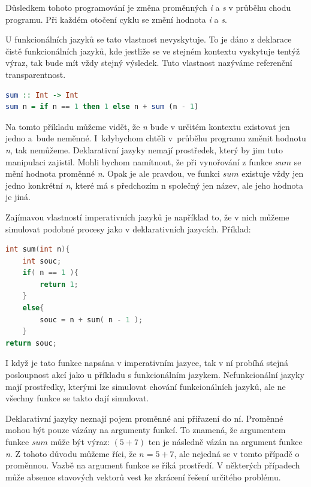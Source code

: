 \documentclass[12pt,a4paper]{report}
\begin{document}
Důsledkem tohoto programování je změna proměnných \textit{i} a \textit{s} v průběhu chodu programu. Při každém otočení cyklu se změní hodnota \textit{i} a \textit{s}.
 
U funkcionálních jazyků se tato vlastnost nevyskytuje. To je dáno z deklarace čistě funkcionálních jazyků, kde jestliže se ve stejném kontextu vyskytuje tentýž výraz, tak bude mít vždy stejný výsledek. %
Tuto vlastnost nazýváme referenční transparentnost.

\begin{lstlisting}[caption={jazyk Haskell}, captionpos=b, language=Haskell]	
sum :: Int -> Int
sum n = if n == 1 then 1 else n + sum (n - 1)
\end{lstlisting} 


Na tomto příkladu můžeme vidět, že \textit{n} bude v určitém kontextu existovat jen jedno a~bude neměnné. I~kdybychom chtěli v~průběhu programu změnit hodnotu \textit{n}, tak nemůžeme. Deklarativní jazyky nemají prostředek, který by jim tuto manipulaci zajistil. Mohli bychom namítnout, že při vynořování z funkce $sum$ se mění hodnota proměnné \textit{n}. Opak je ale pravdou, ve funkci $sum$ existuje vždy jen jedno konkrétní \textit{n}, které má s předchozím n společný jen název, ale jeho hodnota je jiná.

Zajímavou vlastností imperativních jazyků je například to, že v nich můžeme simulovat podobné procesy jako v deklarativních jazycích. \newline
Příklad:

\begin{lstlisting}[caption={jazyk C}, captionpos=b, language = C]	
int sum(int n){
    int souc;
    if( n == 1 ){
        return 1;
    }
    else{
        souc = n + sum( n - 1 );
    }
return souc;
\end{lstlisting} 

I když je tato funkce napsána v imperativním jazyce, tak v ní probíhá stejná posloupnost akcí jako u příkladu s funkcionálním jazykem. Nefunkcionální jazyky mají prostředky, kterými lze simulovat chování funkcionálních jazyků, ale ne všechny funkce se takto dají simulovat. 

Deklarativní jazyky neznají pojem proměnné ani přiřazení do ní. Proměnné mohou být pouze vázány na argumenty funkcí. To znamená, že argumentem funkce $sum$ může být výraz: $(5 + 7)$ ten je následně vázán na argument funkce \textit{n}. Z tohoto důvodu můžeme říci, že $n = 5 + 7$, ale nejedná se v tomto případě o proměnnou. Vazbě na argument funkce se říká prostředí. V některých případech může absence stavových vektorů vest ke zkrácení řešení určitého problému.
\end{document}
